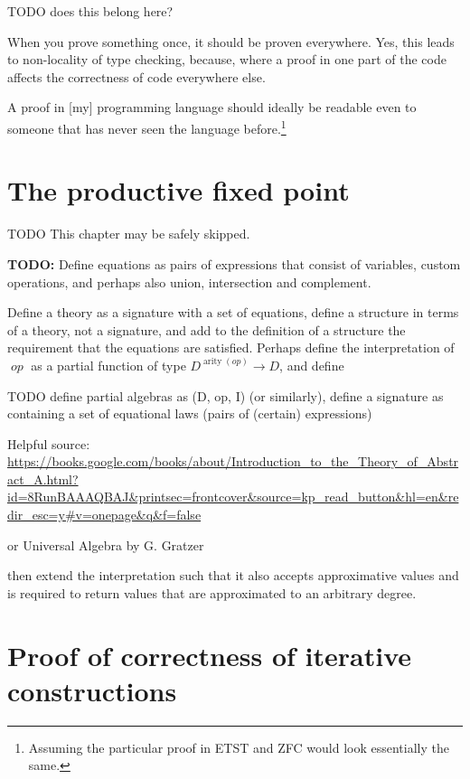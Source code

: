 \documentclass[oneside,12pt]{book}
\newenvironment{TODO}{\par\noindent
  \textbf{\color{black}TODO:} \rmfamily}{}
\theoremstyle{definition}
\theoremstyle{remark}
\newcommand\var[1]{\mathop{\mathit{#1}}\nolimits}
\DeclareMathOperator{\arity}{arity}
\newcommand{\op}{\var{op}}
\begin{document}
TODO does this belong here?

 When you prove something once, it should be proven
everywhere. Yes, this leads to non-locality of type checking, because, where a proof
in one part of the code affects the correctness of code everywhere else.

A proof in [my] programming language should ideally be readable even to someone that has
never seen the language before.\footnote{Assuming the particular proof in ETST and ZFC
would look essentially the same.}


\chapter{The productive fixed point}
TODO This chapter may be safely skipped.

\begin{TODO}
  Define equations as pairs of expressions that consist of variables,
  custom operations, and perhaps also union, intersection and complement.
  
  Define a theory as a signature with a set of equations, define a structure
  in terms of a theory, not a signature, and add to the definition of a structure
  the requirement that the equations are satisfied. Perhaps define the interpretation
  of $\op$ as a partial function of type $D^{\arity(op)} \to D$, and define
\end{TODO}

TODO define partial algebras as (D, op, I) (or similarly), define a signature
as containing a set of equational laws (pairs of (certain) expressions)

Helpful source: \url{https://books.google.com/books/about/Introduction_to_the_Theory_of_Abstract_A.html?id=8RunBAAAQBAJ&printsec=frontcover&source=kp_read_button&hl=en&redir_esc=y#v=onepage&q&f=false}

or Universal Algebra by G. Gratzer

then extend the interpretation such that it also accepts approximative values
and is required to return values that are approximated to an arbitrary degree.


\printbibliography[heading=bibintoc,resetnumbers=0]

\appendix

\chapter{Proof of correctness of iterative constructions}\label{proofCoConst}
\end{document}
